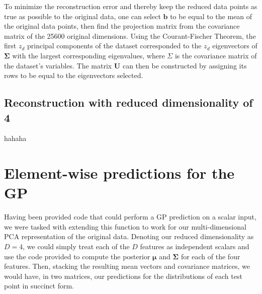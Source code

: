 \documentclass{article}
\begin{document}
To minimize the reconstruction error and thereby keep the reduced data points as true as possible to the original data, one can select $\mathbf{b}$ to be equal to the mean of the original data points, then find the projection matrix from the covariance matrix of the 25600 original dimensions. Using the Courant-Fischer Theorem, the first $z_d$ principal components of the dataset corresponded to the $z_d$ eigenvectors of $\mathbf{\Sigma}$ with the largest corresponding eigenvalues, where $\Sigma$ is the covariance matrix of the dataset's variables. The matrix $\mathbf{U}$ can then be constructed by assigning its rows to be equal to the eigenvectors selected.

\subsection{Reconstruction with reduced dimensionality of 4}
hahaha

\section{Element-wise predictions for the GP}
Having been provided code that could perform a GP prediction on a scalar input, we were tasked with extending this function to work for our multi-dimensional PCA representation of the original data. Denoting our reduced dimensionality as $D = 4$, we could simply treat each of the $D$ features as independent scalars and use the code provided to compute the posterior $\boldsymbol{\mu}$ and $\mathbf{\Sigma}$ for each of the four features. Then, stacking the resulting mean vectors and covariance matrices, we would have, in two matrices, our predictions for the distributions of each test point in succinct form.
\end{document}
